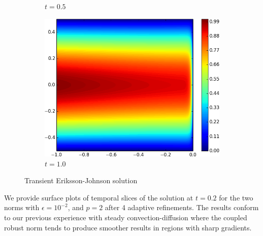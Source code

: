 \documentclass{article}
\theoremstyle{definition}
\theoremstyle{remark}
\begin{document}
\begin{figure}[ht]
\begin{subfigure}[t]{0.32\textwidth}
\caption{$t=0.5$}
\end{subfigure}
\begin{subfigure}[t]{0.32\textwidth}
\centering
\includegraphics[width=\textwidth]{Confusion/Robustness/2d_problem_t_=_10.png}
\caption{$t=1.0$}
\end{subfigure}
\caption{Transient Eriksson-Johnson solution}
\label{fig:transientAnalytical}
\end{figure}

We provide surface plots of temporal slices of the solution at $t=0.2$ for the two norms with $\epsilon=10^{-2}$, 
and $p=2$ after 4 adaptive refinements.
The results conform to our previous experience with steady convection-diffusion where the coupled robust norm 
tends to produce smoother results in regions with sharp gradients.
\end{document}
